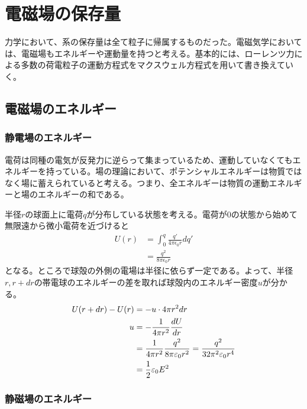 \section{電磁場の保存量}

力学において、系の保存量は全て粒子に帰属するものだった。電磁気学においては、電磁場もエネルギーや運動量を持つと考える。基本的には、ローレンツ力による多数の荷電粒子の運動方程式をマクスウェル方程式を用いて書き換えていく。

\subsection{電磁場のエネルギー}
    \subsubsection{静電場のエネルギー}
        電荷は同種の電気が反発力に逆らって集まっているため、運動していなくてもエネルギーを持っている。場の理論において、ポテンシャルエネルギーは物質ではなく場に蓄えられていると考える。つまり、全エネルギーは物質の運動エネルギーと場のエネルギーの和である。

        半径$r$の球面上に電荷$q$が分布している状態を考える。電荷が0の状態から始めて無限遠から微小電荷を近づけると
        \begin{align*}
            U(r)
            &= \int_0^q \frac{q'}{4\pi\epsilon_0 r} dq'\\
            &= \frac{q^2}{8\pi\epsilon_0 r}
        \end{align*}
        となる。ところで球殻の外側の電場は半径に依らず一定である。よって、半径$r, r + dr$の帯電球のエネルギーの差を取れば球殻内のエネルギー密度$u$が分かる。
        \begin{align*}
            U(r + dr) - U(r) &= -u \cdot 4\pi r^2dr\\
            u &= -\frac{1}{4\pi r^2}\de[U]{r}\\
            &= \frac{1}{4\pi r^2}\frac{q^2}{8\pi\epsilon_0 r^2} = \frac{q^2}{32\pi^2\epsilon_0 r^4}\\
            &= \frac{1}{2}\epsilon_0 E^2\\
        \end{align*}

    \subsubsection{静磁場のエネルギー}
